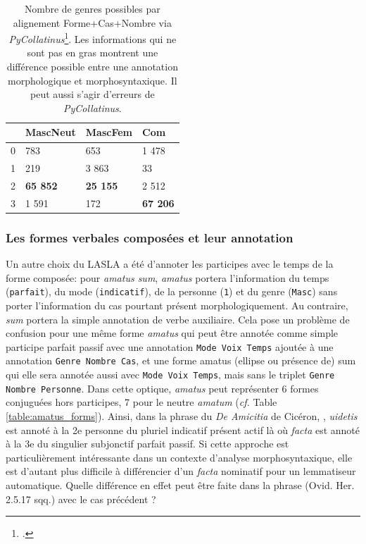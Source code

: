 \begin{table}[h]
\centering
\begin{tabular}{l|lll}
\toprule
         & MascNeut & MascFem & Com    \\ \midrule
0        & 783      & 653     & 1 478  \\
1        & 219      & 3 863   & 33     \\
2        & \textbf{65 852}   & \textbf{25 155}  & 2 512  \\
3        & 1 591    & 172     & \textbf{67 206} \\ \bottomrule
\end{tabular}
\caption{Nombre de genres possibles par alignement Forme+Cas+Nombre via \textit{PyCollatinus}\footcite[\textit{PyCollatinus} est une traduction en python de \textit{Collatinus, cf. }]{thibault_clerice_2018_1243076}. Les informations qui ne sont pas en gras montrent une différence possible entre une annotation morphologique et morphosyntaxique. Il peut aussi s'agir d'erreurs de \textit{PyCollatinus}.}
\label{table:lasla:genders-alignement}
\end{table}

\subsubsection{Les formes verbales composées et leur annotation}

Un autre choix du LASLA a été d'annoter les participes avec le temps de la forme composée: pour \textit{amatus sum}, \textit{amatus} portera l'information du temps (\texttt{parfait}), du mode (\texttt{indicatif}), de la personne (\texttt{1}) et du genre (\texttt{Masc}) sans porter l'information du cas pourtant présent morphologiquement. Au contraire, \textit{sum} portera la simple annotation de verbe auxiliaire. Cela pose un problème de confusion pour une même forme \textit{amatus} qui peut être annotée comme simple participe parfait passif avec une annotation \texttt{Mode Voix Temps} ajoutée à une annotation \texttt{Genre Nombre Cas}, et une forme amatus (ellipse ou présence de) sum qui elle sera annotée aussi avec \texttt{Mode Voix Temps}, mais sans le triplet \texttt{Genre Nombre Personne}. Dans cette optique, \textit{amatus} peut représenter 6 formes conjuguées hors participes, 7 pour le neutre \textit{amatum} (\textit{cf.} Table \ref{table:amatus_forms}). %
%
%
Ainsi, dans la phrase du \textit{De Amicitia} de Cicéron, , \textit{uidetis} est annoté à la 2e personne du pluriel indicatif présent actif là où \textit{facta} est annoté à la 3e du singulier subjonctif parfait passif. Si cette approche est particulièrement intéressante dans un contexte d'analyse morphosyntaxique, elle est d'autant plus difficile à différencier d'un \textit{facta} nominatif pour un lemmatiseur automatique. Quelle différence en effet peut être faite dans la phrase  (Ovid. Her. 2.5.17 sqq.) avec le cas précédent ? %

